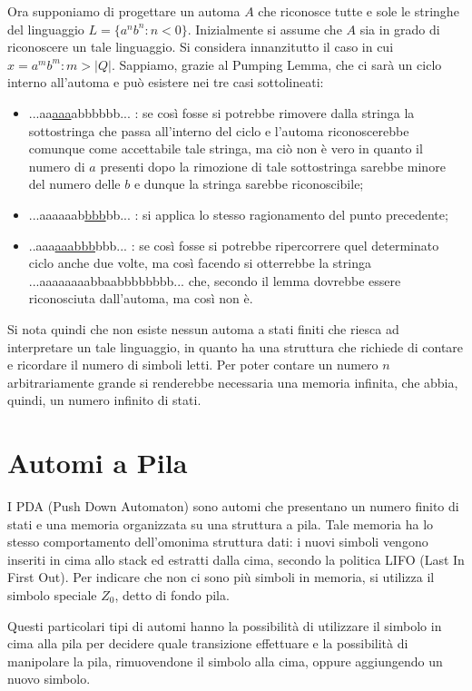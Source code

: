   Ora supponiamo di progettare un automa \(A\) che riconosce tutte e sole le stringhe del linguaggio \(L=\{a^nb^n : n<0\}\). Inizialmente si assume che \(A\) sia in grado di riconoscere un tale linguaggio. Si considera innanzitutto il caso in cui \(x=a^mb^m : m>|Q|\). Sappiamo, grazie al Pumping Lemma, che ci sarà un ciclo interno all’automa e può esistere nei tre casi sottolineati:

  \begin{itemize}
    \item ...aa\underline{aaa}abbbbbb... : se così fosse si potrebbe rimovere dalla stringa la sottostringa che passa all'interno del ciclo e l’automa riconoscerebbe comunque come accettabile tale stringa, ma ciò non è vero in quanto il numero di \(a\) presenti dopo la rimozione di tale sottostringa sarebbe minore del numero delle \(b\) e dunque la stringa sarebbe riconoscibile;
    \item ...aaaaaab\underline{bbb}bb... : si applica lo stesso ragionamento del punto precedente;
    \item ..aaa\underline{aaabbb}bbb... : se così fosse si potrebbe ripercorrere quel determinato ciclo anche due volte, ma così facendo si otterrebbe la stringa ...aaaaaaaabbaabbbbbbbb... che, secondo il lemma dovrebbe essere riconosciuta dall’automa, ma così non è.
  \end{itemize}

  Si nota quindi che non esiste nessun automa a stati finiti che riesca ad interpretare un tale linguaggio, in quanto ha una struttura che richiede di contare e ricordare il numero di simboli letti. Per poter contare un numero \(n\) arbitrariamente grande si renderebbe necessaria una memoria infinita, che abbia, quindi, un numero infinito di stati.

  \section{Automi a Pila}
  I PDA (Push Down Automaton) sono automi che presentano un numero finito di stati  e una memoria organizzata su una struttura a pila. Tale memoria ha lo stesso comportamento dell'omonima struttura dati: i nuovi simboli vengono inseriti in cima allo stack ed estratti dalla cima, secondo la politica LIFO (Last In First Out). Per indicare che non ci sono più simboli in memoria, si utilizza il simbolo speciale \(Z_0\), detto di fondo pila.

  Questi particolari tipi di automi hanno la possibilità di utilizzare il simbolo in cima alla pila per decidere quale transizione effettuare e la possibilità di manipolare la pila, rimuovendone il simbolo alla cima, oppure aggiungendo un nuovo simbolo.

